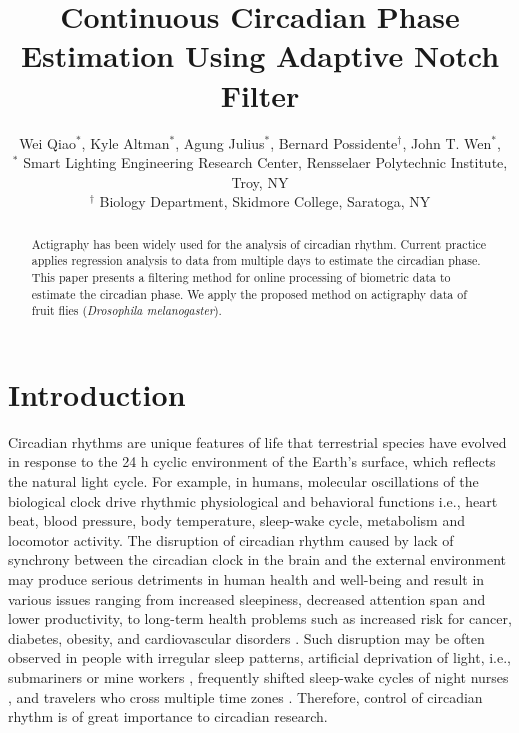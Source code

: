 \documentclass[11pt, onecolumn]{IEEEtran}
\title{\LARGE \bf Continuous Circadian Phase Estimation Using Adaptive Notch Filter}
\author{Wei Qiao$^*$, Kyle Altman$^*$, Agung Julius$^*$, Bernard Possidente$^\dagger$, John T. Wen$^*$, \\ 
$^*$ Smart Lighting Engineering Research Center, Rensselaer Polytechnic Institute, Troy, NY\\
$^\dagger$ Biology Department, Skidmore College, Saratoga, NY}
\begin{document}



\maketitle
\thispagestyle{empty}
\pagestyle{empty}
\newtheorem{remark}{Remark}



\begin{abstract}
Actigraphy has been widely used for the analysis of circadian rhythm.
Current practice applies regression analysis to data from multiple days to estimate the 
circadian phase.  This paper presents a filtering method for online processing  of 
biometric data to estimate the circadian phase. We apply the proposed method on actigraphy data
of fruit flies (\textit{Drosophila melanogaster}).
\end{abstract}


\section{Introduction}\label{intro:sec}
Circadian rhythms are unique features of life that terrestrial species have evolved in response to the 24 h cyclic environment of the Earth's surface, which reflects the natural light cycle. For example, in humans, molecular oscillations of the biological clock drive rhythmic physiological and behavioral functions i.e., heart beat, blood pressure, body temperature, sleep-wake cycle, metabolism and locomotor activity. The disruption of circadian rhythm caused by lack of synchrony between the circadian clock in the brain and the external environment may produce serious detriments in human health and well-being and result in various issues ranging from increased sleepiness, decreased attention span and lower productivity, to long-term health problems such as increased risk for cancer, diabetes, obesity, and cardiovascular disorders \cite{kripke1978circadian,knutsson03,sephton2003circadian,stevens2005circadian,Rea08}.
Such disruption may be often observed in people with irregular sleep patterns, artificial deprivation of light, i.e., submariners or mine workers \cite{kelly1999nonentrained,mills1964circadian}, frequently shifted sleep-wake cycles of night nurses \cite{knutsson03}, and travelers who cross multiple time zones \cite{harrington10}. Therefore, control of circadian rhythm is of great importance to circadian research.
\end{document}
